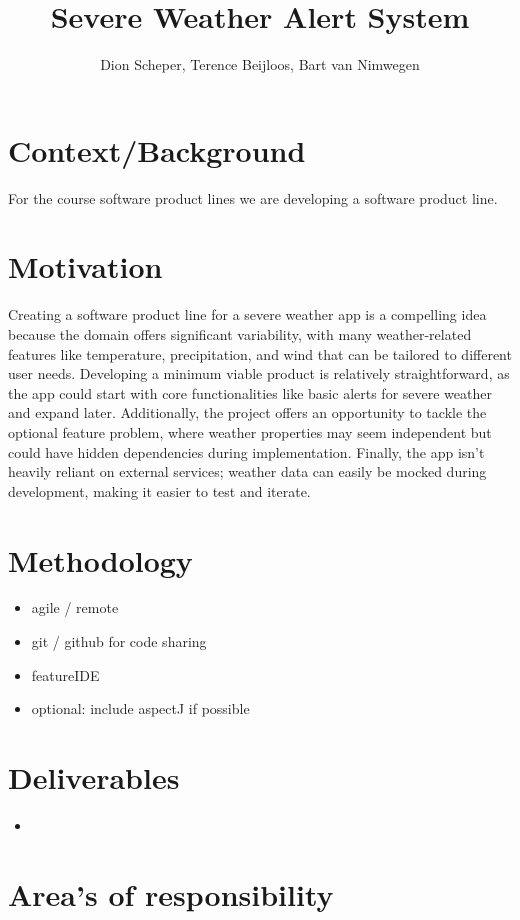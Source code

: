 \documentclass[]{article}
\title{Severe Weather Alert System}
\author{Dion Scheper, Terence Beijloos, Bart van Nimwegen}
\begin{document}
\maketitle

\section{Context/Background}
For the course software product lines we are developing a software product line. 

\section{Motivation}
Creating a software product line for a severe weather app is a compelling idea because the domain offers significant variability, with many weather-related features like temperature, precipitation, and wind that can be tailored to different user needs. 
Developing a minimum viable product is relatively straightforward, as the app could start with core functionalities like basic alerts for severe weather and expand later. Additionally, the project offers an opportunity to tackle the optional feature problem, where weather properties may seem independent but could have hidden dependencies during implementation. 
Finally, the app isn't heavily reliant on external services; weather data can easily be mocked during development, making it easier to test and iterate.

\section{Methodology}
\begin{itemize}
	\item agile / remote
	\item git / github for code sharing
	\item featureIDE
	\item optional: include aspectJ if possible
\end{itemize}

\section{Deliverables}
\begin{itemize}
	\item 
\end{itemize}


\section{Area's of responsibility}
\end{document}
